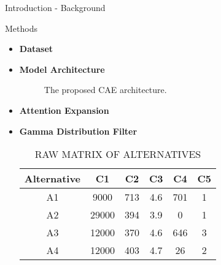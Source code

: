\documentclass[final,hyperref={pdfpagelabels=false}]{beamer}
\begin{document}
\begin{frame}[t]
\begin{columns}[t]
\begin{column}{.465\textwidth}
\begin{block}{Introduction - Background}
\begin{itemize}
\end{itemize}
\end{block}


\begin{block}{Methods}

\begin{itemize}
\item \textbf{Dataset}

\bigskip
\item \textbf {Model Architecture}\\[1cm]

\begin{figure}
\caption{The proposed CAE architecture.}
\end{figure}

\bigskip
\item \textbf{Attention Expansion}

\item\textbf{Gamma Distribution Filter}\\[1cm]

\begin{table}[h!]
\caption{ RAW MATRIX OF ALTERNATIVES}
\begin{center}

 \begin{tabular}{||c| c c c c c||} 
 \hline
 Alternative & C1 & C2 & C3 & C4 & C5 \\ [0.5ex] 
 \hline\hline
 A1 & 9000	 & 713	 & 4.6 &	701 &	1 \\ 
 \hline
 A2 & 29000		 & 394		 & 3.9 &	0 &	1 \\
 \hline
 A3 & 12000		 & 370		 & 4.6	 &	646	 &	3 \\
 \hline
 A4 & 12000		 & 403		 & 4.7	 &	26	 &	2 \\
  \hline
 \end{tabular}
\end{center}
\end{table}
\end{itemize}
\end{block}


\end{column} %
\begin{column}{.03\textwidth}\end{column} %
 

\end{columns}
\end{frame}
\end{document}
